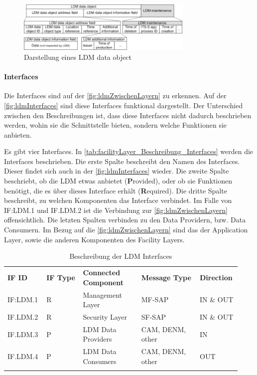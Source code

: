 \begin{figure}[htbp]
	\includegraphics[width=0.75\textwidth]{content/images/04_facilitylayer/LDMdataObject.png}
	\caption{Darstellung eines LDM data object  \cite{LDMdataobject}}
	\label{fig:ldmdataObject}
\end{figure}

\paragraph{Interfaces}
Die Interfaces sind auf der \autoref{fig:ldmZwischenLayern} zu erkennen. Auf der \autoref{fig:ldmInterfaces} sind diese Interfaces funktional dargestellt. Der Unterschied zwischen den Beschreibungen ist, dass diese Interfaces nicht dadurch beschrieben werden, wohin sie die Schnittstelle bieten, sondern welche Funktionen sie anbieten.

Es gibt vier Interfaces. In \autoref{tab:facilityLayer_Beschreibung_Interfaces} werden die Interfaces beschrieben. Die erste Spalte beschreibt den Namen des Interfaces. Dieser findet sich auch in der \autoref{fig:ldmInterfaces} wieder. Die zweite Spalte beschriebt, ob die \ac{LDM} etwas anbietet (\textbf{P}rovided), oder ob sie Funktionen benötigt, die es über dieses Interface erhält (\textbf{R}equired). Die dritte Spalte beschreibt, zu welchen Komponenten das Interface verbindet. Im Falle von IF:LDM.1 und IF.LDM.2 ist die Verbindung zur \autoref{fig:ldmZwischenLayern} offensichtlich. Die letzten Spalten verbinden zu den Data Providern, bzw. Data Consumern. Im Bezug auf die \autoref{fig:ldmZwischenLayern} sind das der Application Layer, sowie die anderen Komponenten des Facility Layers. 

 \begin{longtable}{| p{0.15\linewidth} | p{0.15\linewidth} | p{0.24\linewidth} |p{0.24\linewidth}| p{0.15\linewidth}|}
 \hline
 \textbf{IF ID} & \textbf{IF Type} & \textbf{Connected Component} &  \textbf{Message Type}&\textbf{Direction} \\
IF:LDM.1 & R & Management Layer & MF-SAP & IN \& OUT \\
\hline
IF.LDM.2 & R & Security Layer & SF-SAP & IN \& OUT \\
\hline
IF.LDM.3 & P & LDM Data Providers & CAM, DENM, other & IN \\
\hline
IF.LDM.4 & P & LDM Data Consumers & CAM, DENM, other & OUT \\
\hline 
\caption{Beschreibung der LDM Interfaces \cite{en302895}}
\label{tab:facilityLayer_Beschreibung_Interfaces}
\end{longtable}

